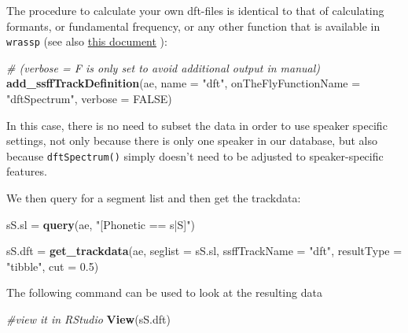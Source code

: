 \documentclass[]{book}
\newenvironment{Shaded}{\begin{snugshade}}{\end{snugshade}}
\newcommand{\CommentTok}[1]{\textcolor[rgb]{0.56,0.35,0.01}{\textit{#1}}}
\newcommand{\DataTypeTok}[1]{\textcolor[rgb]{0.13,0.29,0.53}{#1}}
\newcommand{\FloatTok}[1]{\textcolor[rgb]{0.00,0.00,0.81}{#1}}
\newcommand{\KeywordTok}[1]{\textcolor[rgb]{0.13,0.29,0.53}{\textbf{#1}}}
\newcommand{\NormalTok}[1]{#1}
\newcommand{\OtherTok}[1]{\textcolor[rgb]{0.56,0.35,0.01}{#1}}
\newcommand{\StringTok}[1]{\textcolor[rgb]{0.31,0.60,0.02}{#1}}
\begin{document}
The procedure to calculate your own dft-files is identical to that of calculating formants, or fundamental frequency, or any other function that is available in \texttt{wrassp} (see also \href{http://www.phonetik.uni-muenchen.de/\%7Ejmh/lehre/sem/ws1819/emuR/LESSON4/Signal_Data_Calculation_Extraction_Plotting.html}{this document} ):

\begin{Shaded}
\begin{Highlighting}[]
\CommentTok{# (verbose = F is only set to avoid additional output in manual)}
\KeywordTok{add_ssffTrackDefinition}\NormalTok{(ae,}
                        \DataTypeTok{name =} \StringTok{"dft"}\NormalTok{,}
                        \DataTypeTok{onTheFlyFunctionName =} \StringTok{"dftSpectrum"}\NormalTok{,}
                        \DataTypeTok{verbose =} \OtherTok{FALSE}\NormalTok{)}
\end{Highlighting}
\end{Shaded}

In this case, there is no need to subset the data in order to use speaker specific settings, not only because there is only one speaker in our database, but also because \texttt{dftSpectrum()} simply doesn't need to be adjusted to speaker-specific features.

We then query for a segment list and then get the trackdata:

\begin{Shaded}
\begin{Highlighting}[]
\NormalTok{sS.sl =}\StringTok{ }\KeywordTok{query}\NormalTok{(ae, }
              \StringTok{"[Phonetic == s|S]"}\NormalTok{)}

\NormalTok{sS.dft =}\StringTok{ }\KeywordTok{get_trackdata}\NormalTok{(ae, }
                       \DataTypeTok{seglist =}\NormalTok{ sS.sl, }
                       \DataTypeTok{ssffTrackName =} \StringTok{"dft"}\NormalTok{, }
                       \DataTypeTok{resultType =} \StringTok{"tibble"}\NormalTok{,}
                       \DataTypeTok{cut =} \FloatTok{0.5}\NormalTok{) }
\end{Highlighting}
\end{Shaded}

The following command can be used to look at the resulting data

\begin{Shaded}
\begin{Highlighting}[]
\CommentTok{#view it in RStudio}
\KeywordTok{View}\NormalTok{(sS.dft)}
\end{Highlighting}
\end{Shaded}
\end{document}
